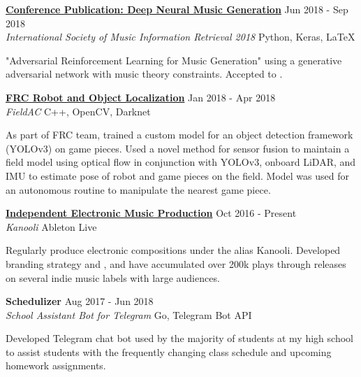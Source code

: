 \documentclass[11pt]{extarticle}
\begin{document}
\noindent
\href{http://ismir2018.ircam.fr/pages/events-lbd.html}{\textbf{Conference Publication: Deep Neural Music Generation}} \hfill Jun 2018 - Sep 2018\\
\textit{International Society of Music Information Retrieval 2018} \hfill Python, Keras, \LaTeX\\
\vspace{-25pt}
\begin{paragraph}{}
\begin{sloppypar}
"Adversarial Reinforcement Learning for Music Generation" using a generative adversarial network with music theory constraints. Accepted to \href{http://ismir2018.ircam.fr/pages/events-lbd.html}{\color{blue}{ISMIR 2018, Late Breaking Session}}.\\
\end{sloppypar}
\end{paragraph}

\noindent
\href{https://github.com/RoboticsTeam4904/FieldAC}{\textbf{FRC Robot and Object Localization}} \hfill Jan 2018 - Apr 2018\\
\textit{FieldAC} \hfill C++, OpenCV, Darknet\\
\vspace{-25pt}
\begin{paragraph}{}
As part of FRC team, trained a custom model for an object detection framework (YOLOv3) on game pieces. Used a novel method for sensor fusion to maintain a field model using optical flow in conjunction with YOLOv3, onboard LiDAR, and IMU to estimate pose of robot and game pieces on the field. Model was used for an autonomous routine to manipulate the nearest game piece.\\
\end{paragraph}

\noindent
\href{https://kanooli.com/}{\textbf{Independent Electronic Music Production}} \hfill Oct 2016 - Present\\
\textit{Kanooli} \hfill Ableton Live\\
\vspace{-25pt}
\begin{paragraph}{}
	Regularly produce electronic compositions under the alias Kanooli. Developed branding strategy and \href{https://kanoo.li/}{\color{blue}{accompanying website}}, and have accumulated over 200k plays through releases on several indie music labels with large audiences.\\
\end{paragraph}

\noindent
\textbf{Schedulizer} \hfill Aug 2017 - Jun 2018\\
\textit{School Assistant Bot for Telegram} \hfill Go, Telegram Bot API \\ 
\vspace{-25pt}
\begin{paragraph}{}
Developed Telegram chat bot used by the majority of students at my high school to assist students with the frequently changing class schedule and upcoming homework assignments. \\
\end{paragraph}
\end{document}
